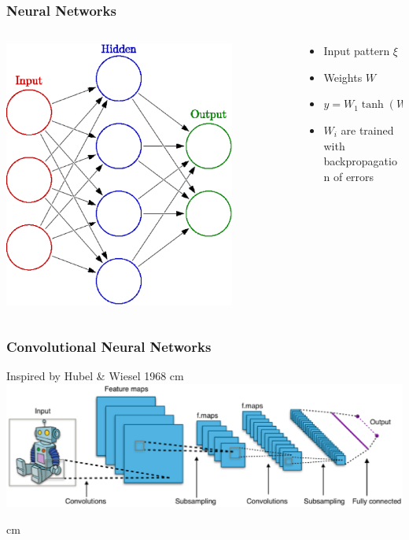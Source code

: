 \documentclass{beamer}
\begin{document}
\begin{frame}
  \frametitle{Neural Networks}
  \begin{columns}
    \begin{column}{0.5\textwidth}
      \includegraphics[width=0.8\textwidth]{neural_network}
    \end{column}
    \begin{column}{0.5\textwidth}
      \begin{itemize}
      \item Input pattern $\xi$
      \item Weights $W$
      \item $y = W_1 \tanh (W_0 \xi) $
      \item $W_i$ are trained with backpropagation of errors
      \end{itemize}
    \end{column}
  \end{columns}
\end{frame}

\begin{frame}
  \frametitle{Convolutional Neural Networks}
  Inspired by Hubel \& Wiesel 1968
   cm
  \includegraphics[width=\textwidth]{ConvolutionalNet}

   cm
  \begin{center}
    \href{http://yann.lecun.com/exdb/lenet/}{}
  \end{center}
\end{frame}
\end{document}
